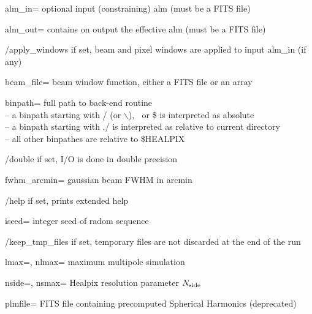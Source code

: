 \begin{keywords}
  \begin{kwlist}{} %
 \item[alm\_in=]    optional input (constraining) alm (must be a FITS file)           

 \item[alm\_out=]   contains on output the effective alm (must be a FITS file)

 \item[/apply\_windows] if set, beam and pixel windows are applied to input alm\_in
(if any)

 \item[beam\_file=] beam window function, either a FITS file or an array

 \item[binpath=] full path to back-end routine \\
              -- a binpath starting with / (or $\backslash$), $~$ or \$ is interpreted as absolute\\
              -- a binpath starting with ./ is interpreted as relative to current directory\\
              -- all other binpathes are relative to \$HEALPIX

 \item[/double]    if set, I/O is done in double precision 

 \item[fwhm\_arcmin=] gaussian beam FWHM in arcmin 

 \item[/help]      if set, prints extended help

 \item[iseed=] integer seed of radom sequence 

 \item[/keep\_tmp\_files] if set, temporary files are not discarded at the end of the
                   run

 \item[lmax=, nlmax=]   maximum multipole simulation 

 \item[nside=, nsmax=]  Healpix resolution parameter $N_{\rm side}$

 \item[plmfile=] FITS file containing precomputed Spherical Harmonics (deprecated) 


\end{kwlist}
\end{keywords}
